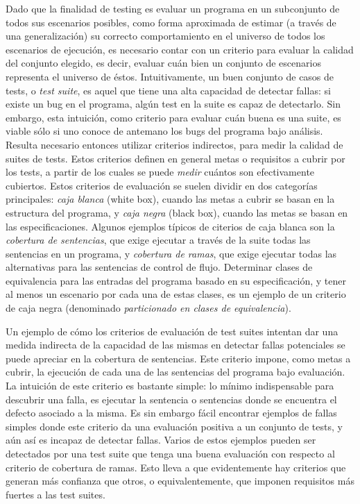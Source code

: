 Dado que la finalidad de testing es evaluar un programa en un subconjunto de todos sus escenarios posibles, como forma aproximada de estimar (a trav\'es de una generalizaci\'on) su correcto comportamiento en el universo de todos los escenarios de ejecuci\'on, es necesario contar con un criterio para evaluar la calidad del conjunto elegido, es decir, evaluar cu\'an bien un conjunto de escenarios representa el universo de \'estos. Intuitivamente, un buen conjunto de casos de tests, o \emph{test suite}, es aquel que tiene una alta capacidad de detectar fallas: si existe un bug en el programa, alg\'un test en la suite es capaz de detectarlo. Sin embargo, esta intuici\'on, como criterio para evaluar cu\'an buena es una suite, es viable s\'olo si uno conoce de antemano los bugs del programa bajo an\'alisis. 
Resulta necesario entonces utilizar criterios indirectos, para medir la calidad de suites de tests. Estos criterios definen en general metas o requisitos a cubrir por los tests, a partir de los cuales se puede \emph{medir} cu\'antos son efectivamente cubiertos. Estos criterios de evaluaci\'on se suelen dividir en dos categor\'ias principales: \emph{caja blanca} (white box), cuando las metas a cubrir se basan en la estructura del programa, y \emph{caja negra} (black box), cuando las metas se basan en las especificaciones. Algunos ejemplos t\'ipicos de citerios de caja blanca son la \emph{cobertura de sentencias}, que exige ejecutar a trav\'es de la suite todas las sentencias en un programa, y \emph{cobertura de ramas}, que exige ejecutar todas las alternativas para las sentencias de control de flujo. Determinar clases de equivalencia para las entradas del programa basado en su especificaci\'on, y tener al menos un escenario por cada una de estas clases, es un ejemplo de un criterio de caja negra (denominado \emph{particionado en clases de equivalencia}).

Un ejemplo de c\'omo los criterios de evaluaci\'on de test suites intentan dar una medida indirecta de la capacidad de las mismas en detectar fallas potenciales se puede apreciar en la cobertura de sentencias. Este criterio impone, como metas a cubrir, la ejecuci\'on de cada una de las sentencias del programa bajo evaluaci\'on. La intuici\'on de este criterio es bastante simple: lo m\'inimo indispensable para descubrir una falla, es ejecutar la sentencia o sentencias donde se encuentra el defecto asociado a la misma. Es sin embargo f\'acil encontrar ejemplos de fallas simples donde este criterio da una evaluaci\'on positiva a un conjunto de tests, y a\'un as\'i es incapaz de detectar fallas. Varios de estos ejemplos pueden ser detectados por una test suite que tenga una buena evaluaci\'on con respecto al criterio de cobertura de ramas. Esto lleva a que evidentemente hay criterios que generan m\'as confianza que otros, o equivalentemente, que imponen requisitos m\'as fuertes a las test suites. 

